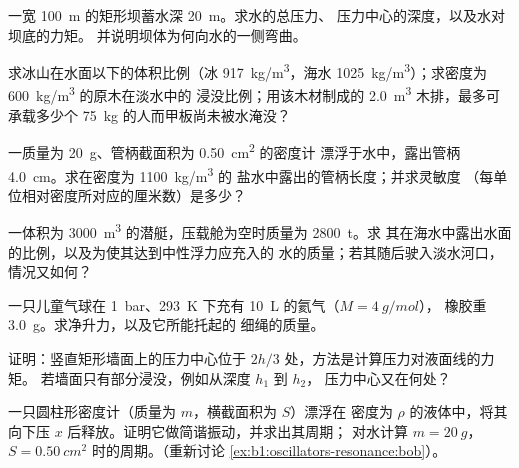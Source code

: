 \begin{exercise}[$\star\star$]\label{exo:b1:fluid-statics:6}
一宽 \qty{100}{m} 的矩形坝蓄水深 \qty{20}{m}。求水的总压力、
压力中心的深度，以及水对坝底的力矩。
并说明坝体为何向水的一侧弯曲。
\end{exercise}

\begin{exercise}[$\star\star$]\label{exo:b1:fluid-statics:7}
求冰山在水面以下的体积比例（冰 \qty{917}{kg/m^3}，海水
\qty{1025}{kg/m^3}）；求密度为 \qty{600}{kg/m^3} 的原木在淡水中的
浸没比例；用该木材制成的 \qty{2.0}{m^3} 木排，最多可承载多少个
\qty{75}{kg} 的人而甲板尚未被水淹没？
\end{exercise}

\begin{exercise}[$\star\star$]\label{exo:b1:fluid-statics:8}
一质量为 \qty{20}{g}、管柄截面积为 \qty{0.50}{cm^2} 的密度计
漂浮于水中，露出管柄 \qty{4.0}{cm}。求在密度为 \qty{1100}{kg/m^3} 的
盐水中露出的管柄长度；并求灵敏度
（每单位相对密度所对应的厘米数）是多少？
\end{exercise}

\begin{exercise}[$\star\star$]\label{exo:b1:fluid-statics:9}
一体积为 \qty{3000}{m^3} 的潜艇，压载舱为空时质量为 \qty{2800}{t}。求
其在海水中露出水面的比例，以及为使其达到中性浮力应充入的
水的质量；若其随后驶入淡水河口，
情况又如何？
\end{exercise}

\begin{exercise}[$\star\star\star$]\label{exo:b1:fluid-statics:10}
一只儿童气球在 \qty{1}{bar}、\qty{293}{K} 下充有 \qty{10}{L} 的氦气（$M = \qty{4}{g/mol}$），
橡胶重 \qty{3.0}{g}。求净升力，以及它所能托起的
细绳的质量。
\end{exercise}

\begin{exercise}[$\star\star\star$]\label{exo:b1:fluid-statics:11}
证明：竖直矩形墙面上的压力中心位于
$2h/3$ 处，方法是计算压力对液面线的力矩。
若墙面只有部分浸没，例如从深度 $h_1$ 到 $h_2$，
压力中心又在何处？
\end{exercise}

\begin{exercise}[$\star\star\star$]\label{exo:b1:fluid-statics:12}
一只圆柱形密度计（质量为 $m$，横截面积为 $S$）漂浮在
密度为 $\rho$ 的液体中，将其向下压 $x$ 后释放。证明它做简谐振动，并求出其周期；
对水计算 $m =
\qty{20}{g}$，$S = \qty{0.50}{cm^2}$ 时的周期。（重新讨论
\cref{ex:b1:oscillators-resonance:bob}）。
\end{exercise}

